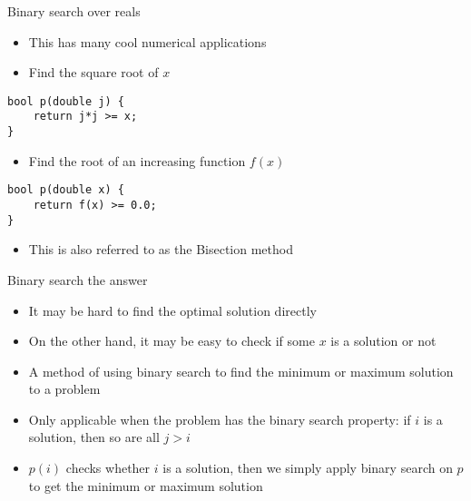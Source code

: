 \documentclass[12pt,t]{beamer}
\newcommand{\bi}{\begin{itemize}}
\newcommand{\ei}{\end{itemize}}
\begin{document}
\begin{frame}[fragile]{Binary search over reals}
    \bi
        \item This has many cool numerical applications
        \vspace{5pt}
        \item Find the square root of $x$
    \ei
    \begin{verbatim}
bool p(double j) {
    return j*j >= x;
}
    \end{verbatim}
    \bi
        \item Find the root of an increasing function $f(x)$
    \ei
    \begin{verbatim}
bool p(double x) {
    return f(x) >= 0.0;
}
    \end{verbatim}

    \bi
        \item This is also referred to as the Bisection method
    \ei
\end{frame}



\begin{frame}{Binary search the answer}
    \vspace{10pt}
    \bi
        \item It may be hard to find the optimal solution directly
        \item On the other hand, it may be easy to check if some $x$ is a solution or not
        \vspace{5pt}
        \item A method of using binary search to find the minimum or maximum solution to a problem
        \item Only applicable when the problem has the binary search property: if $i$ is a solution, then so are all $j > i$
        \vspace{5pt}
        \item $p(i)$ checks whether $i$ is a solution, then we simply apply binary search on $p$ to get the minimum or maximum solution
    \ei
\end{frame}
\end{document}
